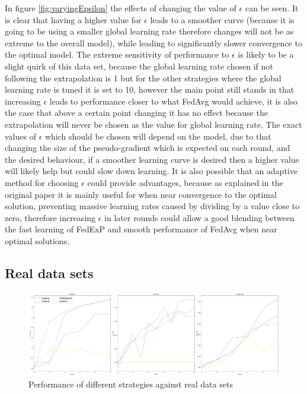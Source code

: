 \documentclass{article}
\begin{document}
In figure \ref{fig:varyingEpsilon} the effects of changing the value of $\epsilon$ can be seen.  It is clear that having a higher value for $\epsilon$ leads to a smoother curve (because it is going to be using a smaller global learning rate therefore changes will not be as extreme to the overall model), while leading to significantly slower convergence to the optimal model.  The extreme sensitivity of performance to $\epsilon$ is likely to be a slight quirk of this data set, because the global learning rate chosen if not following the extrapolation is 1 but for the other strategies where the global learning rate is tuned it is set to 10, however the main point still stands in that increasing $\epsilon$ leads to performance closer to what FedAvg would achieve, it is also the case that above a certain point changing it has no effect because the extrapolation will never be chosen as the value for global learning rate.  The exact values of $\epsilon$ which should be chosen will depend on the model, due to that changing the size of the pseudo-gradient which is expected on each round, and the desired behaviour, if a smoother learning curve is desired then a higher value will likely help but could slow down learning.  It is also possible that an adaptive method for choosing $\epsilon$ could provide advantages, because as explained in the original paper it is mainly useful for when near convergence to the optimal solution, preventing massive learning rates caused by dividing by a value close to zero, therefore increasing $\epsilon$ in later rounds could allow a good blending between the fast learning of FedExP and smooth performance of FedAvg when near optimal solutions.

\subsection{Real data sets}

\begin{figure}
    \centerline{\includegraphics[width=\linewidth]{figs/realDatasetPerformance.pdf}}
    \caption{Performance of different strategies against real data sets}
    \label{fig:realDatasetPerformance}
\end{figure}
\end{document}
